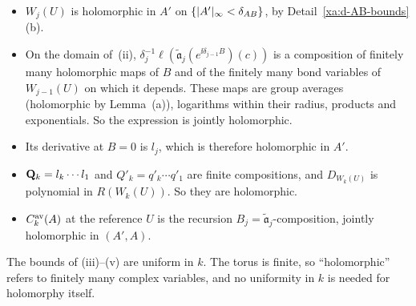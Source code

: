 \begin{detail}\label{xa:d-AB-vi}
\begin{itemize}
\item $W_j(U)$ is holomorphic in $A'$ on $\{\lvert A'\rvert_\infty<\delta_{AB}\}$, by Detail~\ref{xa:d-AB-bounds}(b).
\item On the domain of~(ii), $\delta_j^{-1}\ell(\tilde{\mathfrak a}_j(e^{\ii\delta_{j-1}B})(c))$ is a composition of finitely many holomorphic maps of $B$ and of the finitely many bond variables of $W_{j-1}(U)$ on which it depends. These maps are group averages (holomorphic by Lemma~(a)), logarithms within their radius, products and exponentials. So the expression is jointly holomorphic.
\item Its derivative at $B=0$ is $l_j$, which is therefore holomorphic in $A'$.
\item $\mathbf Q_k=l_k\cdots l_1$ and $Q'_k=q'_k\cdots q'_1$ are finite compositions, and $D_{W_k(U)}$ is polynomial in $R(W_k(U))$. So they are holomorphic.
\item $C^{\rm av}_k(A)$ at the reference $U$ is the recursion $B_j=\tilde{\mathfrak a}_j$-composition, jointly holomorphic in $(A',A)$.
\end{itemize}
The bounds of (iii)--(v) are uniform in $k$. The torus is finite, so ``holomorphic'' refers to finitely many complex variables, and no uniformity in $k$ is needed for holomorphy itself.
\end{detail}

